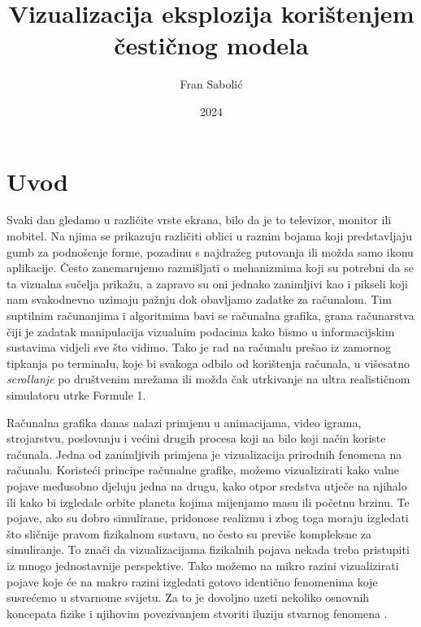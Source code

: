 \documentclass{foi}
\title{Vizualizacija eksplozija korištenjem čestičnog modela}
\author{Fran Sabolić}
\date{2024}
\begin{document}
\maketitle

\tableofcontents

\pagestyle{plain}
\chapter{Uvod}

Svaki dan gledamo u različite vrste ekrana, bilo da je to televizor, monitor ili mobitel. Na njima se prikazuju različiti oblici u raznim bojama koji predstavljaju gumb za podnošenje forme, pozadinu s najdražeg putovanja ili možda samo ikonu aplikacije. Često zanemarujemo razmišljati o mehanizmima koji su potrebni da se ta vizualna sučelja prikažu, a zapravo su oni jednako zanimljivi kao i pikseli koji nam svakodnevno uzimaju pažnju dok obavljamo zadatke za računalom. Tim suptilnim računanjima i algoritmima bavi se računalna grafika, grana računarstva čiji je zadatak manipulacija vizualnim podacima kako bismo u informacijskim sustavima vidjeli sve što vidimo. Tako je rad na računalu prešao iz zamornog tipkanja po terminalu, koje bi svakoga odbilo od korištenja računala, u višesatno \textit{scrollanje} po društvenim mrežama ili možda čak utrkivanje na ultra realističnom simulatoru utrke Formule 1.

Računalna grafika danas nalazi primjenu u animacijama, video igrama, strojarstvu, poslovanju i većini drugih procesa koji na bilo koji način koriste računala. Jedna od zanimljivih primjena je vizualizacija prirodnih fenomena na računalu. Koristeći principe računalne grafike, možemo vizualizirati kako valne pojave međusobno djeluju jedna na drugu, kako otpor sredstva utječe na njihalo ili kako bi izgledale orbite planeta kojima mijenjamo masu ili početnu brzinu. Te pojave, ako su dobro simulirane, pridonose realizmu i zbog toga moraju izgledati što sličnije pravom fizikalnom sustavu, no često su previše kompleksne za simuliranje. To znači da vizualizacijama fizikalnih pojava nekada treba pristupiti iz mnogo jednostavnije perspektive. Tako možemo na mikro razini vizualizirati pojave koje će na makro razini izgledati gotovo identično fenomenima koje susrećemo u stvarnome svijetu. Za to je dovoljno uzeti nekoliko osnovnih koncepata fizike i njihovim povezivanjem stvoriti iluziju stvarnog fenomena \parencite{FasterCapital2024}.
\end{document}
